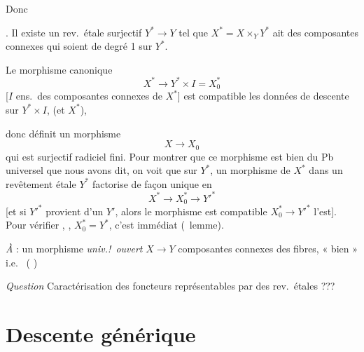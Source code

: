 \documentclass[11pt,a4paper]{article}
\begin{document}
Donc

\emph{} . Il existe un rev.\ étale
surjectif $Y^{*} \to Y$ tel que $X^{*} = X \times_Y Y^{*}$ ait des
composantes connexes qui soient de degré 1 sur $Y^{*}$.

Le morphisme canonique
\[
X^{*} \longrightarrow Y^{*} \times I = X^{*}_0
\]
[$I$ ens.\ des composantes connexes de
$X^{*}$] est compatible \add{\ill{} \ill{}} \struck{\ill{}}  les
données de descente sur $Y^{*} \times I$, (et $X^{*}$),
\ill{}


donc définit un morphisme
\[
X \longrightarrow X_0
\]
qui est surjectif radiciel fini.
Pour montrer que ce morphisme est
bien  du Pb universel que nous avons
dit, on voit que sur $Y^{*}$, un morphisme de $X^{*}$
dans un revêtement étale   $Y^{*}$ factorise
de façon unique en
\[
X^{*} \longrightarrow X^{*}_0 \longrightarrow Y'^{*}
\]
[et si $Y'^{*}$ provient d'un $Y'$, alors le
morphisme \struck{\ill{}}  est compatible
\ill{} \ill{}  
 $X^{*}_0 \to Y'^{*}$ l'est].
Pour vérifier  , \ill{} \ill{} \ill{}
 \ill{}, \ill{} \ill{} $X^{*}_0 = Y^{*}$,  c'est
immédiat \ill{} (\ lemme).

\emph{À \struck{\ill{}} } \ill{} \ill{} \ill{}
\ill{} \ill{} : un morphisme \struck{\ill{}} \emph{univ.!\
ouvert} $X \to Y$ \ill{} \ill{} \ill{} composantes
connexes \add{\ill{}} des fibres,
«  bien » i.e.\ \ill{} \ill{} ( \add{\ill{}})
\struck{\ill{}}

\emph{Question} Caractérisation des foncteurs
représentables par des rev.\ étales ???

\section*{Descente générique}
\end{document}

